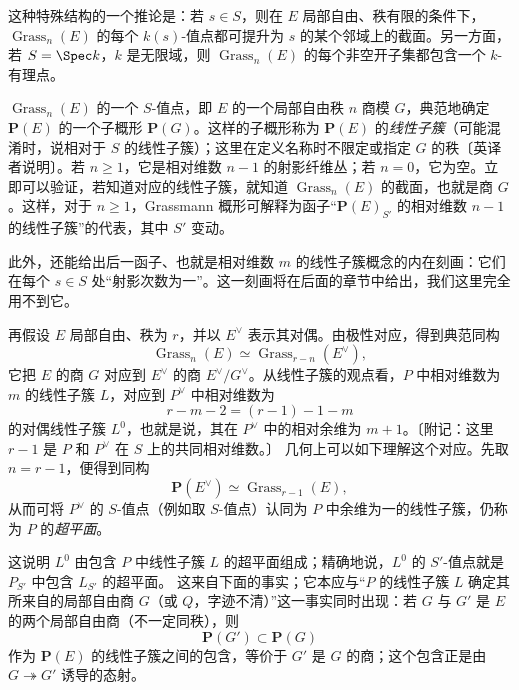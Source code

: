 这种特殊结构的一个推论是：若 $s\in S$，则在 $E$ 局部自由、秩有限的条件下，$\operatorname{Grass}_n(E)$ 的每个 $k(s)$-值点都可提升为 $s$ 的某个邻域上的截面。另一方面，若 $S=\Spec k$，$k$ 是无限域，则 $\operatorname{Grass}_n(E)$ 的每个非空开子集都包含一个 $k$-有理点。

$\operatorname{Grass}_n(E)$ 的一个 $S$-值点，即 $E$ 的一个局部自由秩 $n$ 商模 $G$，典范地确定 $\mathbf P(E)$ 的一个子概形 $\mathbf P(G)$。这样的子概形称为 $\mathbf P(E)$ 的\emph{线性子簇}（可能混淆时，说相对于 $S$ 的线性子簇）；这里在定义名称时不限定或指定 $G$ 的秩〔英译者说明〕。若 $n\geq1$，它是相对维数 $n-1$ 的射影纤维丛；若 $n=0$，它为空。立即可以验证，若知道对应的线性子簇，就知道 $\operatorname{Grass}_n(E)$ 的截面，也就是商 $G$。这样，对于 $n\geq1$，Grassmann 概形可解释为函子“$\mathbf P(E)_{S'}$ 的相对维数 $n-1$ 的线性子簇”的代表，其中 $S'$ 变动。

此外，还能给出后一函子、也就是相对维数 $m$ 的线性子簇概念的内在刻画：它们在每个 $s\in S$ 处“射影次数为一”。这一刻画将在后面的章节中给出，我们这里完全用不到它。

再假设 $E$ 局部自由、秩为 $r$，并以 $E^\vee$ 表示其对偶。由极性对应，得到典范同构
\[
\operatorname{Grass}_n(E)\simeq
\operatorname{Grass}_{r-n}(E^\vee),
\]
它把 $E$ 的商 $G$ 对应到 $E^\vee$ 的商 $E^\vee/G^\vee$。从线性子簇的观点看，$P$ 中相对维数为 $m$ 的线性子簇 $L$，对应到 $P^\vee$ 中相对维数为
\[
r-m-2=(r-1)-1-m
\]
的对偶线性子簇 $L^0$，也就是说，其在 $P^\vee$ 中的相对余维为 $m+1$。〔附记：这里 $r-1$ 是 $P$ 和 $P^\vee$ 在 $S$ 上的共同相对维数。〕
几何上可以如下理解这个对应。先取 $n=r-1$，便得到同构
\[
\mathbf P(E^\vee)\simeq\operatorname{Grass}_{r-1}(E),
\]
从而可将 $P^\vee$ 的 $S$-值点（例如取 $S$-值点）认同为 $P$ 中余维为一的线性子簇，仍称为 $P$ 的\emph{超平面}。

这说明 $L^0$ 由包含 $P$ 中线性子簇 $L$ 的超平面组成；精确地说，$L^0$ 的 $S'$-值点就是 $P_{S'}$ 中包含 $L_{S'}$ 的超平面。
这来自下面的事实；它本应与“$P$ 的线性子簇 $L$ 确定其所来自的局部自由商 $G$（或 $Q$，字迹不清）”这一事实同时出现：若 $G$ 与 $G'$ 是 $E$ 的两个局部自由商（不一定同秩），则
\[
\mathbf P(G')\subset\mathbf P(G)
\]
作为 $\mathbf P(E)$ 的线性子簇之间的包含，等价于 $G'$ 是 $G$ 的商；这个包含正是由 $G\twoheadrightarrow G'$ 诱导的态射。

